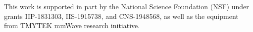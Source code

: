 This work is supported in part by the National Science Foundation (NSF) under grants IIP-1831303, IIS-1915738, and CNS-1948568, as well as the equipment from TMYTEK mmWave research initiative.